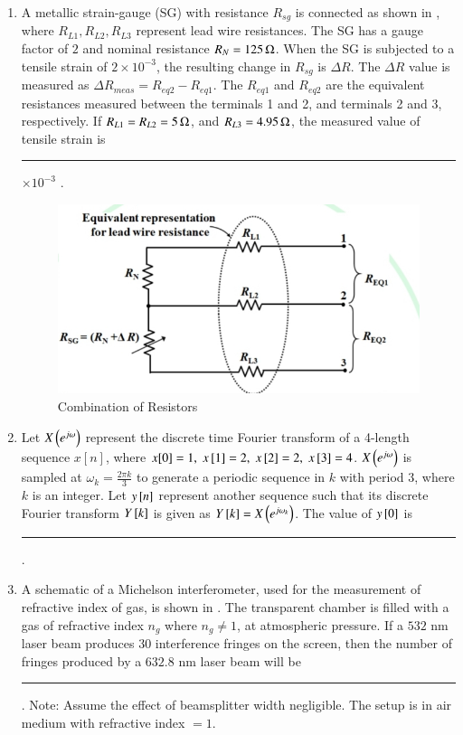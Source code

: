 \documentclass[journal,12pt,onecolumn]{IEEEtran}
\theoremstyle{remark}
\begin{document}
\begin{enumerate}
\item A metallic strain-gauge (SG) with resistance $R_{sg}$ is connected as shown in , where $R_{L1}, R_{L2}, R_{L3}$ represent lead wire resistances. The SG has a gauge factor of $2$ and nominal resistance $R_N=125\,\ohm$. When the SG is subjected to a tensile strain of $2\times 10^{-3}$, the resulting change in $R_{sg}$ is $\Delta R$. The $\Delta R$ value is measured as $\Delta R_{meas}=R_{eq2}-R_{eq1}$. The $R_{eq1}$ and $R_{eq2}$ are the equivalent resistances measured between the terminals 1 and 2, and terminals 2 and 3, respectively. If $R_{L1}=R_{L2}=5\,\ohm$, and $R_{L3}=4.95\,\ohm$, the measured value of tensile strain is \rule{1.5cm}{0.4pt}$\times 10^{-3}$ . \par\hfill{}

\begin{figure}[H]
\centering
\includegraphics[width=0.6\columnwidth]{Figs/Q-53.jpg}
\caption{Combination of Resistors}
\label{53}
\end{figure}


\item Let $X\left(e^{j\omega}\right)$ represent the discrete time Fourier transform of a 4-length sequence $x[n]$, where $x[0]=1,\;x{}\left[1\right]=2,\;x{}\left[2\right]=2,\;x{}\left[3\right]=4$. $X\left(e^{j\omega}\right)$ is sampled at $\omega_k=\frac{2\pi k}{3}$ to generate a periodic sequence in $k$ with period $3$, where $k$ is an integer. Let $y{}\left[n\right]$ represent another sequence such that its discrete Fourier transform $Y{}\left[k\right]$ is given as $Y{}\left[k\right] =X\left(e^{j\omega_k}\right)$. The value of $y{}\left[0\right]$ is \rule{1.5cm}{0.4pt}. \par\hfill{}


\item A schematic of a Michelson interferometer, used for the measurement of refractive index of gas, is shown in . The transparent chamber is filled with a gas of refractive index $n_g$ where $n_g \ne 1$, at atmospheric pressure. If a $532$ nm laser beam produces $30$ interference fringes on the screen, then the number of fringes produced by a $632.8$ nm laser beam will be \rule{1.5cm}{0.4pt} .  
Note: Assume the effect of beamsplitter width negligible. The setup is in air medium with refractive index $=1$. \par\hfill{}


\end{enumerate}
\end{document}
